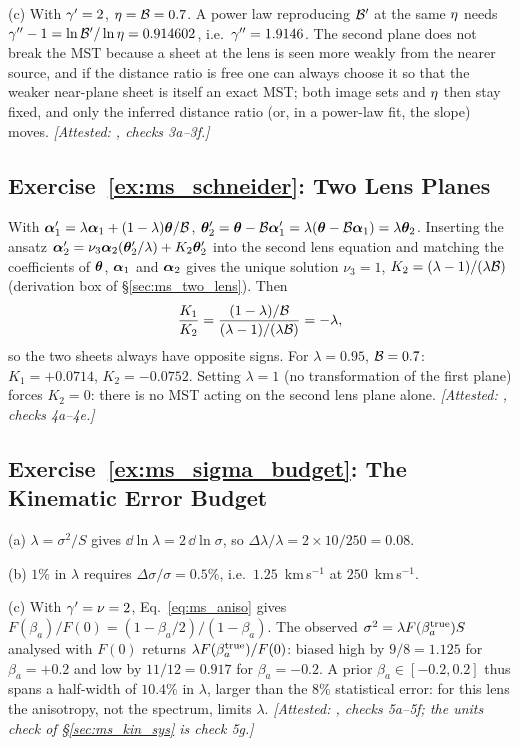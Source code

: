 (c) With $\gamma'=2$, $\eta=\mathcal{B}=0.7$.  A power law reproducing
$\mathcal{B}'$ at the same $\eta$ needs
$\gamma''-1=\ln\mathcal{B}'/\ln\eta=0.914602$, i.e.\ $\gamma''=1.9146$.  The second
plane does not break the MST because a sheet at the lens is seen more weakly
from the nearer source, and if the distance ratio is free one can always
choose it so that the weaker near-plane sheet is itself an exact MST; both
image sets and $\eta$ then stay fixed, and only the inferred distance
ratio (or, in a power-law fit, the slope) moves.
\emph{[Attested: , checks 3a--3f.]}

\subsection*{Exercise~\ref{ex:ms_schneider}: Two Lens Planes}

With $\boldsymbol{\alpha}_1'=\lambda\boldsymbol{\alpha}_1+(1-\lambda)\boldsymbol{\theta}/\mathcal{B}$,
$\boldsymbol{\theta}_2'=\boldsymbol{\theta}-\mathcal{B}\boldsymbol{\alpha}_1'=\lambda(\boldsymbol{\theta}-\mathcal{B}\boldsymbol{\alpha}_1)=\lambda\boldsymbol{\theta}_2$.
Inserting the ansatz $\boldsymbol{\alpha}_2'=\nu_3\boldsymbol{\alpha}_2(\boldsymbol{\theta}_2'/\lambda)+K_2\boldsymbol{\theta}_2'$
into the second lens equation and matching the coefficients of $\boldsymbol{\theta}$,
$\boldsymbol{\alpha}_1$ and $\boldsymbol{\alpha}_2$ gives the unique solution $\nu_3=1$,
$K_2=(\lambda-1)/(\lambda\mathcal{B})$ (derivation box of \S\ref{sec:ms_two_lens}).
Then
\[
\frac{K_1}{K_2}=\frac{(1-\lambda)/\mathcal{B}}{(\lambda-1)/(\lambda\mathcal{B})}=-\lambda ,
\]
so the two sheets always have opposite signs.  For $\lambda=0.95$, $\mathcal{B}=0.7$:
$K_1=+0.0714$, $K_2=-0.0752$.  Setting $\lambda=1$ (no transformation of the
first plane) forces $K_2=0$: there is no MST acting on the second lens plane
alone.
\emph{[Attested: , checks 4a--4e.]}

\subsection*{Exercise~\ref{ex:ms_sigma_budget}: The Kinematic Error Budget}

(a) $\lambda=\sigma^2/S$ gives $\dd\ln\lambda=2\,\dd\ln\sigma$, so
$\Delta\lambda/\lambda=2\times10/250=0.08$.

(b) $1\%$ in $\lambda$ requires $\Delta\sigma/\sigma=0.5\%$, i.e.\
$1.25$~km\,s$^{-1}$ at $250$~km\,s$^{-1}$.

(c) With $\gamma'=\nu=2$, Eq.~\eqref{eq:ms_aniso} gives
$F(\beta_a)/F(0)=(1-\beta_a/2)/(1-\beta_a)$.  The observed
$\sigma^2=\lambda F(\beta_a^{\rm true})S$ analysed with $F(0)$ returns
$\lambda F(\beta_a^{\rm true})/F(0)$: biased high by $9/8=1.125$ for
$\beta_a=+0.2$ and low by $11/12=0.917$ for $\beta_a=-0.2$.  A prior
$\beta_a\in[-0.2,0.2]$ thus spans a half-width of $10.4\%$ in $\lambda$,
larger than the $8\%$ statistical error: for this lens the anisotropy, not the
spectrum, limits $\lambda$.
\emph{[Attested: , checks 5a--5f; the units check of \S\ref{sec:ms_kin_sys} is check 5g.]}

